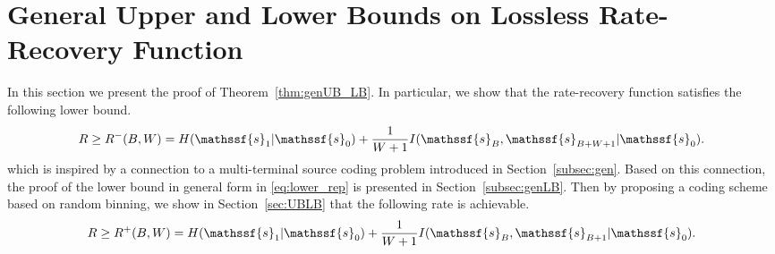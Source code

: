 \documentclass[journal, twocolumn, 10pt]{IEEEtran}
\newcommand{\rvs}{{\mathssf{s}}}    %
\newcommand{\bof}[1]{\textbf{#1}}
\begin{document}
%
%
%
%
%
%
%
%

\section{General Upper and Lower Bounds on Lossless Rate-Recovery Function}
\label{sec:THM1}
In this section we present the proof of Theorem~\ref{thm:genUB_LB}. In particular, we show that the rate-recovery function satisfies the following lower bound.
\begin{align}
R\ge R^{-}(B,W) =H(\rvs_{1}|\rvs_{0}) + \frac{1}{W+1} I(\rvs_{B}, \rvs_{B+W+1}|\rvs_{0})\label{eq:lower_rep}.
\end{align} which is inspired by a connection to a
multi-terminal source coding problem introduced in Section~\ref{subsec:gen}. Based on this connection, the proof of the lower bound in general form in \eqref{eq:lower_rep} is presented in Section~\ref{subsec:genLB}.  
Then by proposing a coding scheme based on random binning, we show in Section~\ref{sec:UBLB} that the following rate is achievable. 
\begin{align}
R\ge R^{+}(B,W) =H(\rvs_{1}|\rvs_{0}) + \frac{1}{W+1} I(\rvs_{B}, \rvs_{B+1}|\rvs_{0}).
\end{align} 
\end{document}
